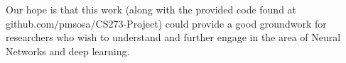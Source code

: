 \documentclass[11pt,onecolumn]{article} %
\begin{document}
	Our hope is that this work (along with the provided code found at github.com/pmsosa/CS273-Project) could provide a good groundwork for researchers who wish to understand and further engage in the area of Neural Networks and deep learning.
	
	
	
	
	\nocite{iamtrask,neuralnet}
	
\end{document}
